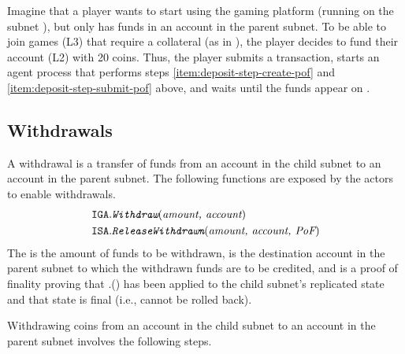 \begin{example}
\label{ex:deposit}

Imagine that a player wants to start using the gaming platform (running on the subnet ), but only has funds in an account  in the parent subnet.
To be able to join games (L3) that require a collateral (as in ), the player decides to fund their account  (L2) with 20 coins.
Thus, the player submits a  transaction, starts an \ipc agent process that performs steps \ref{item:deposit-step-create-pof} and \ref{item:deposit-step-submit-pof} above,
and waits until the funds appear on .
\end{example}

\subsection{Withdrawals}
\label{sec:withdraw}

A \gls{withdrawal} is a transfer of funds from an account in the child subnet to an account in the parent subnet.
The following functions are exposed by the \ipc actors to enable withdrawals.
\begin{align*}
    \texttt{IGA}.&\textit{\texttt{Withdraw}}(\textit{amount, account})\\
    \texttt{ISA}.&\textit{\texttt{ReleaseWithdrawn}}(\textit{amount, account, \textit{PoF}})
\end{align*}
The  is the amount of funds to be withdrawn,  is the destination account in the parent subnet to which the withdrawn funds are to be credited, and \funcParam{\pof} is a proof of finality proving that \gw.() has been applied to the child subnet's replicated state and that state is final (i.e., cannot be rolled back).

Withdrawing  coins from an account  in the child subnet  to an account  in the parent subnet 
involves the following steps.

